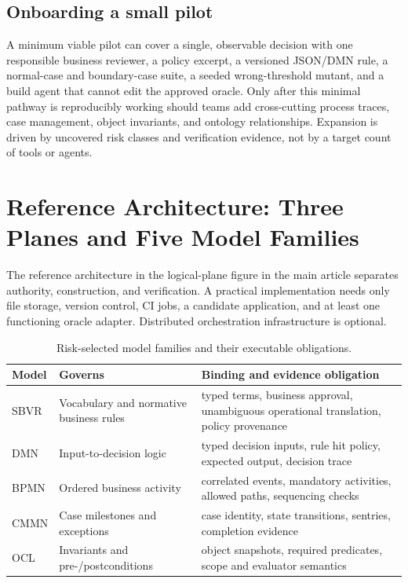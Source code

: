 \documentclass[11pt,a4paper]{article}
\begin{document}
\subsection{Onboarding a small pilot}
A minimum viable pilot can cover a single, observable decision with one responsible business reviewer, a policy excerpt, a versioned JSON/DMN rule, a normal-case and boundary-case suite, a seeded wrong-threshold mutant, and a build agent that cannot edit the approved oracle. Only after this minimal pathway is reproducibly working should teams add cross-cutting process traces, case management, object invariants, and ontology relationships. Expansion is driven by uncovered risk classes and verification evidence, not by a target count of tools or agents.

\section{Reference Architecture: Three Planes and Five Model Families}
The reference architecture in the logical-plane figure in the main article separates authority, construction, and verification. A practical implementation needs only file storage, version control, CI jobs, a candidate application, and at least one functioning oracle adapter. Distributed orchestration infrastructure is optional.



\begin{table}[htbp]
\centering\small
\caption{Risk-selected model families and their executable obligations.}
\begin{tabularx}{\linewidth}{@{}p{13mm}p{29mm}X@{}}
\toprule
Model & Governs & Binding and evidence obligation \\
\midrule
SBVR & Vocabulary and normative business rules & typed terms, business approval, unambiguous operational translation, policy provenance \\
DMN & Input-to-decision logic & typed decision inputs, rule hit policy, expected output, decision trace \\
BPMN & Ordered business activity & correlated events, mandatory activities, allowed paths, sequencing checks \\
CMMN & Case milestones and exceptions & case identity, state transitions, sentries, completion evidence \\
OCL & Invariants and pre-/postconditions & object snapshots, required predicates, scope and evaluator semantics \\
\bottomrule
\end{tabularx}
\label{tab:models}
\end{table}
\end{document}
